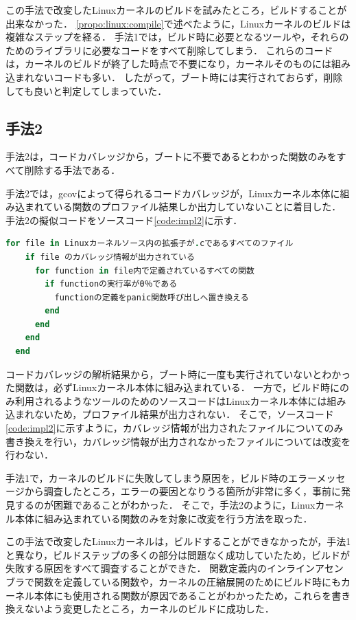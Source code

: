 \documentclass[graduation-thesis]{mlarticle}
\begin{document}
この手法で改変したLinuxカーネルのビルドを試みたところ，ビルドすることが出来なかった．
\ref{propo:linux:compile}で述べたように，Linuxカーネルのビルドは複雑なステップを経る．
手法1では，ビルド時に必要となるツールや，それらのためのライブラリに必要なコードをすべて削除してしまう．
これらのコードは，カーネルのビルドが終了した時点で不要になり，カーネルそのものには組み込まれないコードも多い．
したがって，ブート時には実行されておらず，削除しても良いと判定してしまっていた．



\subsection{手法2}
\label{implementation:2}
手法2は，コードカバレッジから，ブートに不要であるとわかった関数のみをすべて削除する手法である．

手法2では，gcovによって得られるコードカバレッジが，Linuxカーネル本体に組み込まれている関数のプロファイル結果しか出力していないことに着目した．
手法2の擬似コードをソースコード\ref{code:impl2}に示す．

\begin{lstlisting}[language=ruby, caption=手法2の擬似コード, label=code:impl2]
  for file in Linuxカーネルソース内の拡張子が.cであるすべてのファイル
    if file のカバレッジ情報が出力されている
      for function in file内で定義されているすべての関数
        if functionの実行率が0％である
          functionの定義をpanic関数呼び出しへ置き換える
        end
      end
    end
  end
\end{lstlisting}

コードカバレッジの解析結果から，ブート時に一度も実行されていないとわかった関数は，必ずLinuxカーネル本体に組み込まれている．
一方で，ビルド時にのみ利用されるようなツールのためのソースコードはLinuxカーネル本体には組み込まれないため，プロファイル結果が出力されない．
そこで，ソースコード\ref{code:impl2}に示すように，カバレッジ情報が出力されたファイルについてのみ書き換えを行い，カバレッジ情報が出力されなかったファイルについては改変を行わない．

手法1で，カーネルのビルドに失敗してしまう原因を，ビルド時のエラーメッセージから調査したところ，エラーの要因となりうる箇所が非常に多く，事前に発見するのが困難であることがわかった．
そこで，手法2のように，Linuxカーネル本体に組み込まれている関数のみを対象に改変を行う方法を取った．

この手法で改変したLinuxカーネルは，ビルドすることができなかったが，手法1と異なり，ビルドステップの多くの部分は問題なく成功していたため，ビルドが失敗する原因をすべて調査することができた．
関数定義内のインラインアセンブラで関数を定義している関数や，カーネルの圧縮展開のためにビルド時にもカーネル本体にも使用される関数が原因であることがわかったため，これらを書き換えないよう変更したところ，カーネルのビルドに成功した．
\end{document}
